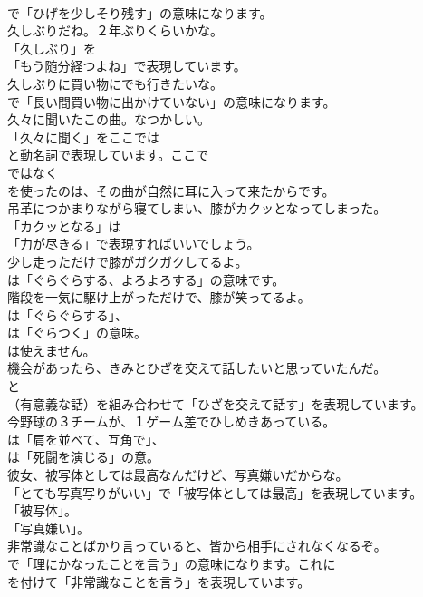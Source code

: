 \documentclass[8pt]{extreport}
\begin{document}
\begin{CJK}{UTF8}{min}
\\	で「ひげを少しそり残す」の意味になります。	
\\	久しぶりだね。２年ぶりくらいかな。 
\\	「久しぶり」を
\\	「もう随分経つよね」で表現しています。	
\\	久しぶりに買い物にでも行きたいな。 
\\	で「長い間買い物に出かけていない」の意味になります。	
\\	久々に聞いたこの曲。なつかしい。 
\\	「久々に聞く」をここでは
\\	と動名詞で表現しています。ここで
\\	ではなく
\\	を使ったのは、その曲が自然に耳に入って来たからです。	
\\	吊革につかまりながら寝てしまい、膝がカクッとなってしまった。 
\\	「カクッとなる」は
\\	「力が尽きる」で表現すればいいでしょう。	
\\	少し走っただけで膝がガクガクしてるよ。 
\\	は「ぐらぐらする、よろよろする」の意味です。	
\\	階段を一気に駆け上がっただけで、膝が笑ってるよ。 
\\	は「ぐらぐらする」、
\\	は「ぐらつく」の意味。
\\	は使えません。	
\\	機会があったら、きみとひざを交えて話したいと思っていたんだ。 
\\	と 
\\	（有意義な話）を組み合わせて「ひざを交えて話す」を表現しています。	
\\	今野球の３チームが、１ゲーム差でひしめきあっている。 
\\	は「肩を並べて、互角で」、
\\	は「死闘を演じる」の意。	
\\	彼女、被写体としては最高なんだけど、写真嫌いだからな。 
\\	「とても写真写りがいい」で「被写体としては最高」を表現しています。
\\	「被写体」。
\\	「写真嫌い」。	
\\	非常識なことばかり言っていると、皆から相手にされなくなるぞ。 
\\	で「理にかなったことを言う」の意味になります。これに
\\	を付けて「非常識なことを言う」を表現しています。	

\end{CJK}
\end{document}
